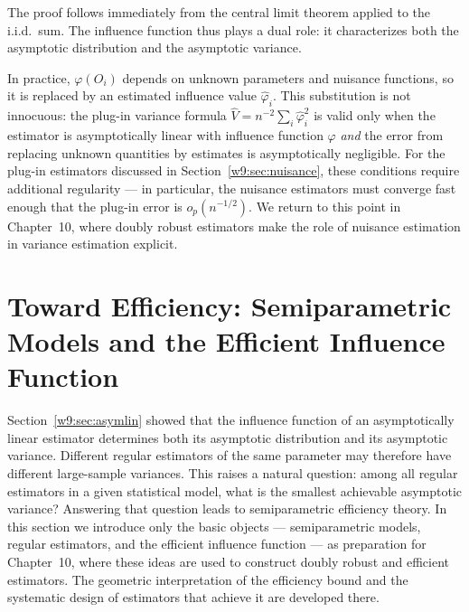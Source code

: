 \documentclass[master.tex]{subfiles}
\begin{document}
The proof follows immediately from the central limit theorem applied to
the i.i.d.\ sum.  The influence function thus plays a dual role: it
characterizes both the asymptotic distribution and the asymptotic
variance.

\begin{remark}
\label{w9:rem:plugin-if}
In practice, $\varphi(O_i)$ depends on unknown parameters and nuisance
functions, so it is replaced by an estimated influence value
$\hat\varphi_i$.  This substitution is not innocuous: the plug-in
variance formula $\hat V = n^{-2}\sum_i\hat\varphi_i^2$ is valid only
when the estimator is asymptotically linear with influence function
$\varphi$ \emph{and} the error from replacing unknown quantities by
estimates is asymptotically negligible.  For the plug-in estimators
discussed in Section~\ref{w9:sec:nuisance}, these conditions require
additional regularity --- in particular, the nuisance estimators must
converge fast enough that the plug-in error is $o_p(n^{-1/2})$.  We
return to this point in Chapter~10, where doubly robust estimators
make the role of nuisance estimation in variance estimation explicit.
\end{remark}

\section{Toward Efficiency: Semiparametric Models and the Efficient Influence Function}
\label{w9:sec:efficiency}

Section~\ref{w9:sec:asymlin} showed that the influence function of an
asymptotically linear estimator determines both its asymptotic
distribution and its asymptotic variance.  Different regular estimators
of the same parameter may therefore have different large-sample
variances.  This raises a natural question: among all regular estimators
in a given statistical model, what is the smallest achievable asymptotic
variance?  Answering that question leads to semiparametric efficiency
theory.  In this section we introduce only the basic objects ---
semiparametric models, regular estimators, and the efficient influence
function --- as preparation for Chapter~10, where these ideas are used
to construct doubly robust and efficient estimators.  The geometric
interpretation of the efficiency bound and the systematic design of
estimators that achieve it are developed there.
\end{document}
